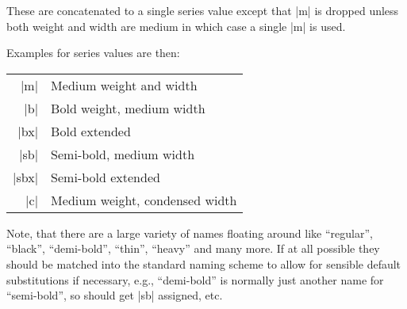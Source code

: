 \documentclass{ltxguide}[1995/11/28]
\begin{document}
These are concatenated to a single series value except that |m| is
dropped unless both weight and width are medium in which case a single
|m| is used.

Examples for series values are then:
\begin{center}
\begin{minipage}{.7\linewidth}
   \begin{tabular}{rl}
      |m|    & Medium weight and width  \\
      |b|    & Bold weight, medium width  \\
      |bx|   & Bold extended \\
      |sb|   & Semi-bold, medium width\\
      |sbx|   & Semi-bold extended\\
      |c|    & Medium weight, condensed width
   \end{tabular}
\end{minipage}
\end{center}
Note, that there are a large variety of names floating around like
``regular'', ``black'', ``demi-bold'', ``thin'', ``heavy'' and many
more. If at all possible they should be matched into the standard
naming scheme to allow for sensible default substitutions if
necessary, e.g., ``demi-bold'' is normally just another name for
``semi-bold'', so should get |sb| assigned, etc.
\end{document}
